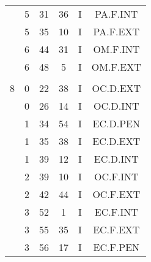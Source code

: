 \documentclass[12pt, a4paper]{article}
\begin{document}
\begin{multicols}{3}
{\begin{tabular}{c c c c c c}
	 	 	 	 & 5 & 31 & 36 & I & PA.F.INT\\%
	 	 	 	 & 5 & 35 & 10 & I & PA.F.EXT\\%
	 	 	 	 & 6 & 44 & 31 & I & OM.F.INT\\%
	 	 	 	 & 6 & 48 & 5 & I & OM.F.EXT\\%
	 	 	 	 & & & & & \\%
	 	 	 	8 & 0 & 22 & 38 & I & OC.D.EXT\\%
	 	 	 	 & 0 & 26 & 14 & I & OC.D.INT\\%
	 	 	 	 & 1 & 34 & 54 & I & EC.D.PEN\\%
	 	 	 	 & 1 & 35 & 38 & I & EC.D.EXT\\%
	 	 	 	 & 1 & 39 & 12 & I & EC.D.INT\\%
	 	 	 	 & 2 & 39 & 10 & I & OC.F.INT\\%
	 	 	 	 & 2 & 42 & 44 & I & OC.F.EXT\\%
	 	 	 	 & 3 & 52 & 1 & I & EC.F.INT\\%
	 	 	 	 & 3 & 55 & 35 & I & EC.F.EXT\\%
	 	 	 	 & 3 & 56 & 17 & I & EC.F.PEN\\%
	 	 \end{tabular}
 	}
\end{multicols}
\end{document}
